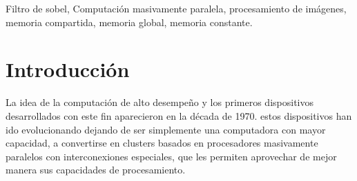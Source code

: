 \documentclass[journal]{IEEEtran}
\begin{document}




\maketitle


\begin{abstract}
En este art\'iculo se realizar\'a una comparativa para establecer las diferencias de rendimiento en t\'erminos de tiempo de ejecuci\'o, entre la implementaci\'on del filtro de sobel disponible en la librer\'ia OpenCV y tres implementaciones del mismo realizadas para GPU usando diferentes t\'ecnicas de uso de memoria. Las  implementaciones del filtro de sobel realizadas por el equipo est\'an soportadas sobre la librer\'ia CUDA para dispositivos NVIDIA.
\end{abstract}

\begin{IEEEkeywords}
Filtro de sobel, Computaci\'on masivamente paralela, procesamiento de im\'agenes, memoria compartida, memoria global, memoria constante.
\end{IEEEkeywords}






%
\IEEEpeerreviewmaketitle



\section{Introducci\'on}
La idea de la computaci\'on de alto desempe\~no y los primeros dispositivos desarrollados con este fin aparecieron en la d\'ecada de 1970. estos dispositivos han ido evolucionando dejando de ser simplemente una computadora con mayor capacidad, a convertirse en clusters  basados en procesadores masivamente paralelos con interconexiones especiales, que les permiten aprovechar de mejor manera sus capacidades de procesamiento.
\end{document}
